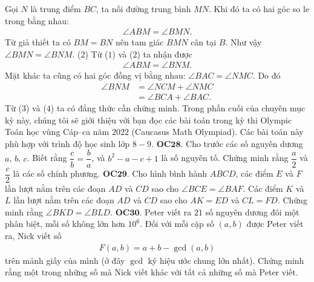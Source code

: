 \begin{multicols}{2}
\begin{center}
	\end{center}
	Gọi $N$ là trung điểm $BC$, ta nối đường trung bình $MN$. Khi đó ta có hai góc so le trong bằng nhau:
	\begin{align*}
		\angle ABM = \angle BMN. \tag{$1$}
	\end{align*}	
	Từ giả thiết ta có $BM= BN$ nên tam giác $BMN$ cân tại $B$.
	\vskip 0.1cm
	Như vậy $\angle BMN =\angle BNM$. \hfill ($2$)
	\vskip 0.1cm
	Từ ($1$) và ($2$) ta nhận được
	\begin{align*}
		\angle ABM= \angle BNM. \tag{$3$}
	\end{align*}
	Mặt khác ta cũng có hai góc đồng vị bằng nhau: $\angle BAC=\angle NMC$. Do đó 
	\begin{align*}
		\angle BNM&= \angle NCM + \angle NMC\\
		&= \angle BCA + \angle BAC. \tag{$4$}
	\end{align*}
	Từ ($3$) và ($4$) ta có đẳng thức cần chứng minh.
	\vskip 0.1cm
	Trong phần cuối của chuyên mục kỳ này, chúng tôi sẽ giới thiệu với bạn đọc các bài toán trong kỳ thi Olympic Toán học vùng Cáp--ca năm $2022$ (Caucasus Math Olympiad). Các bài toán này phù hợp với trình độ học sinh lớp $8-9$.
	\vskip 0.1cm
	{\bf\color{cackithi} OC$\pmb{28.}$} Cho trước các số nguyên dương $a$, $b$, $c$. Biết rằng $\dfrac{c}{b} = \dfrac{b}{a}$, và $b^2 - a - c + 1$ là số nguyên tố. Chứng minh rằng $\dfrac{a}{2}$ và $\dfrac{c}{2}$ là các số chính phương.
	\vskip 0.1cm
	{\bf\color{cackithi} OC$\pmb{29.}$} Cho hình bình hành $ABCD$, các điểm $E$ và $F$ lần lượt nằm trên các đoạn $AD$ và $CD$ sao cho $\angle BCE = \angle BAF.$ Các điểm $K$ và $L$ lần lượt nằm trên các đoạn $AD$ và $CD$ sao cho $AK = ED$ và $CL = FD$. Chứng minh rằng $\angle BKD = \angle BLD$.
	\vskip 0.1cm
	{\bf\color{cackithi} OC$\pmb{30.}$} Peter viết ra $21$ số nguyên dương đôi một phân biệt, mỗi số không lớn hơn $10^6$. Đối với mỗi cặp số $(a, b)$ được Peter viết ra, Nick  viết  số
	\begin{align*}
		F(a, b) = a + b - \gcd (a, b)
	\end{align*}
	trên mảnh giấy của mình (ở đây $\gcd$ ký hiệu ước chung lớn nhất). 
	\vskip 0.1cm
	Chứng minh rằng một trong những số mà Nick viết khác với tất cả những số mà Peter viết. 
\end{multicols}
\vspace*{-10pt}
